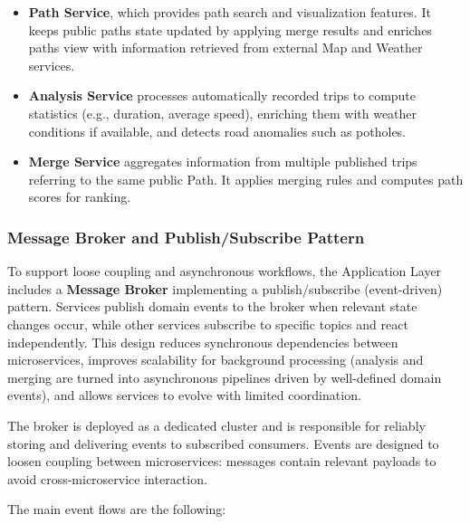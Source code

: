 \begin{itemize}
    \item \textbf{Path Service}, which provides path search and visualization features. It keeps public paths state updated by applying merge results and enriches paths view with information retrieved from external Map and Weather services.
    
    \item \textbf{Analysis Service} processes automatically recorded trips to compute statistics (e.g., duration, average speed), enriching them with weather conditions if available, and detects road anomalies such as potholes.
    
    \item \textbf{Merge Service} aggregates information from multiple published trips referring to the same public Path. It applies merging rules and computes path scores for ranking.
\end{itemize}

\subsubsection{Message Broker and Publish/Subscribe Pattern}
To support loose coupling and asynchronous workflows, the Application Layer includes a \textbf{Message Broker} implementing a publish/subscribe (event-driven) pattern. Services publish domain events to the broker when relevant state changes occur, while other services subscribe to specific topics and react independently. This design reduces synchronous dependencies between microservices, improves scalability for background processing (analysis and merging are turned into asynchronous pipelines driven by well-defined domain events), and allows services to evolve with limited coordination.

The broker is deployed as a dedicated cluster and is responsible for reliably storing and delivering events to subscribed consumers. Events are designed to loosen coupling between microservices: messages contain relevant payloads to avoid cross-microservice interaction.

The main event flows are the following:


